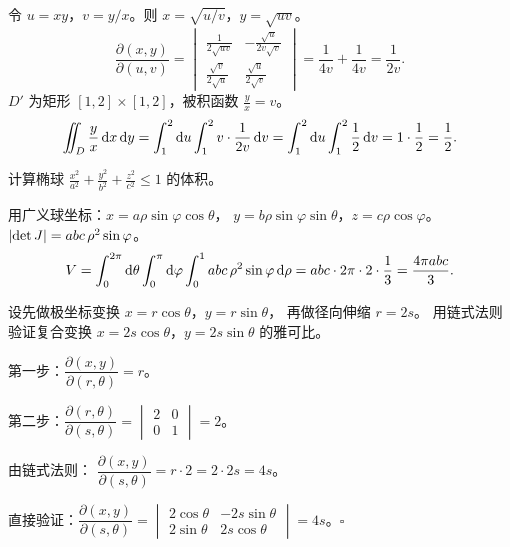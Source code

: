 \documentclass{ctexart}
\begin{document}
\begin{solution}
  令 $u = xy$，$v = y/x$。则 $x = \sqrt{u/v}$，$y = \sqrt{uv}$。
  \[
    \frac{\partial(x,y)}{\partial(u,v)}
    = \begin{vmatrix} \frac{1}{2\sqrt{uv}} & -\frac{\sqrt{u}}{2v\sqrt{v}} \\
        \frac{\sqrt{v}}{2\sqrt{u}} & \frac{\sqrt{u}}{2\sqrt{v}} \end{vmatrix}
    = \frac{1}{4v} + \frac{1}{4v} = \frac{1}{2v}.
  \]
  $D'$ 为矩形 $[1,2] \times [1,2]$，被积函数 $\frac{y}{x} = v$。
  \[
    \iint_D \frac{y}{x} \,\mathrm{d} x\,\mathrm{d} y
    = \int_1^2 \mathrm{d} u \int_1^2 v \cdot \frac{1}{2v} \,\mathrm{d} v
    = \int_1^2 \mathrm{d} u \int_1^2 \frac{1}{2} \,\mathrm{d} v
    = 1 \cdot \frac{1}{2} = \frac{1}{2}.
  \]
\end{solution}

\begin{exercise}
  计算椭球 $\frac{x^2}{a^2}+\frac{y^2}{b^2}+\frac{z^2}{c^2} \le 1$ 的体积。
\end{exercise}

\begin{solution}
  用广义球坐标：$x = a\rho\sin\varphi\cos\theta$，
  $y = b\rho\sin\varphi\sin\theta$，$z = c\rho\cos\varphi$。
  $\left| \det J \right| = abc\,\rho^2\sin\varphi$。
  \[
    V = \int_0^{2\pi} \mathrm{d} \theta \int_0^\pi \mathrm{d} \varphi \int_0^1 abc\,\rho^2\sin\varphi \,\mathrm{d} \rho
    = abc \cdot 2\pi \cdot 2 \cdot \frac{1}{3}
    = \frac{4\pi abc}{3}.
  \]
\end{solution}

\begin{exercise}[链式法则应用]
  设先做极坐标变换 $x = r\cos\theta$，$y = r\sin\theta$，
  再做径向伸缩 $r = 2s$。
  用链式法则验证复合变换 $x = 2s\cos\theta$，$y = 2s\sin\theta$ 的雅可比。
\end{exercise}

\begin{solution}
  第一步：$\dfrac{\partial(x,y)}{\partial(r,\theta)} = r$。

  第二步：$\dfrac{\partial(r,\theta)}{\partial(s,\theta)} = \begin{vmatrix} 2 & 0 \\ 0 & 1 \end{vmatrix} = 2$。

  由链式法则：
  $\dfrac{\partial(x,y)}{\partial(s,\theta)} = r \cdot 2 = 2 \cdot 2s = 4s$。

  直接验证：$\dfrac{\partial(x,y)}{\partial(s,\theta)} = \begin{vmatrix} 2\cos\theta & -2s\sin\theta \\ 2\sin\theta & 2s\cos\theta \end{vmatrix} = 4s$。$\square$
\end{solution}
\end{document}
